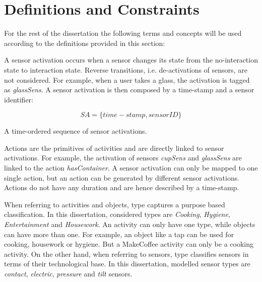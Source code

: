 \section{Definitions and Constraints}
\label{sec:approach:def}

For the rest of the dissertation the following terms and concepts will be used according to the definitions provided in this section:

\begin{defn}
 A sensor activation occurs when a sensor changes its state from the no-interaction state to interaction state. Reverse transitions, i.e. de-activations of sensors, are not considered. For example, when a user takes a glass, the activation is tagged as \textit{glassSens}. A sensor activation is then composed by a time-stamp and a sensor identifier:
 
 \begin{equation}
  SA = \{ time-stamp, sensorID \}
 \end{equation}

\end{defn}

\begin{defn}
 A time-ordered sequence of sensor activations.
\end{defn}

\begin{defn}[Actions]
 Actions are the primitives of activities and are directly linked to sensor activations. For example, the activation of sensors \textit{cupSens} and \textit{glassSens} are linked to the action \textit{hasContainer}. A sensor activation can only be mapped to one single action, but an action can be generated by different sensor activations. Actions do not have any duration and are hence described by a time-stamp.
\end{defn}

\begin{defn}[Type]
 When referring to activities and objects, type captures a purpose based classification. In this dissertation, considered types are \textit{Cooking}, \textit{Hygiene}, \textit{Entertainment} and \textit{Housework}. An activity can only have one type, while objects can have more than one. For example, an object like a tap can be used for cooking, housework or hygiene. But a MakeCoffee activity can only be a cooking activity. On the other hand, when referring to sensors, type classifies sensors in terms of their technological base. In this dissertation, modelled sensor types are \textit{contact}, \textit{electric}, \textit{pressure} and \textit{tilt} sensors. 
\end{defn}

